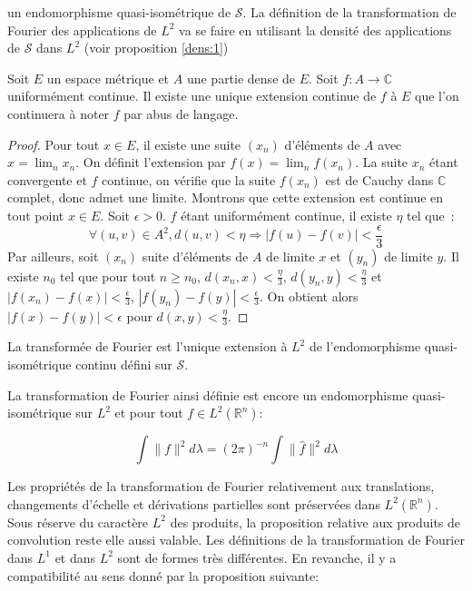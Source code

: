 un endomorphisme quasi-isométrique de $\mathcal{S}$.
La définition de la transformation de Fourier des applications de
$L^2$ va se faire en utilisant la densité des applications
de $\mathcal{S}$ dans $L^2$ (voir proposition \ref{dens:1})
\begin{prop}
Soit $E$ un espace métrique et $A$ une partie dense de $E$. Soit $f
: A \to \mathbb{C}$ uniformément continue. Il existe une unique
extension continue de $f$ à $E$ que l'on continuera à noter $f$ par
abus de langage.
\end{prop}
\begin{proof}
Pour tout $x \in E$, il existe une suite $(x_n)$ d'éléments de $A$
avec $x = \lim_n x_n$. On définit l'extension par $f(x) = \lim_n
f(x_n)$. La suite $x_n$ étant convergente et $f$ continue, on vérifie
que la suite $f(x_n)$ est de Cauchy dans $\mathbb{C}$ complet, donc
admet une limite. Montrons que cette extension est continue en tout
point $x \in E$. Soit $\epsilon > 0$.  $f$ étant uniformément
continue, il existe  $\eta$ tel que~:
\[
\forall (u,v) \in A^2, d(u,v) < \eta
\Rightarrow |f(u)-f(v)| < \frac{\epsilon}{3}
\]
Par ailleurs, soit $(x_n)$ suite d'éléments de $A$ de limite $x$ et
$(y_n)$ de limite $y$. Il existe $n_0$ tel que pour tout $n \geq n_0$,
$d(x_n,x) < \frac{\eta}{3}$, $d(y_n,y) < \frac{\eta}{3}$ et
$|f(x_n)-f(x)| < \frac{\epsilon}{3}$, $|f(y_n)-f(y)| <
\frac{\epsilon}{3}$. On obtient alors $|f(x)-f(y)|< \epsilon$ pour
$d(x,y) < \frac{\eta}{3}$.
\end{proof}
\begin{mandatory}
\begin{defn}
La transformée de Fourier est l'unique extension à $L^2$ de
l'endomorphisme quasi-isométrique continu défini sur $\mathcal{S}$.
\end{defn}
\end{mandatory}
La transformation de Fourier ainsi définie est encore un endomorphisme
quasi-isométrique sur $L^2$ et pour tout $f \in L^2(\mathbb{R}^n)$:
\begin{mandatory}
\[
 \int \|f\|^2 d \lambda = (2\pi)^{-n} \int \|\widehat{f}\|^2 d \lambda
\]
\end{mandatory}
Les propriétés de la transformation de Fourier 
relativement aux translations, changements d'échelle et dérivations partielles
sont préservées dans $L^2(\mathbb{R}^n)$. Sous réserve du caractère $L^2$ des
produits, la proposition relative aux produits de convolution reste elle aussi
valable.
 Les définitions de la transformation de Fourier dans $L^1$ et dans
$L^2$ sont de formes très différentes. En revanche, il y a compatibilité au sens donné par la proposition suivante:
